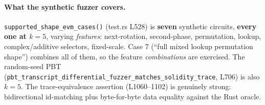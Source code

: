 \paragraph{What the synthetic fuzzer covers.}
\texttt{supported\_\allowbreak{}shape\_\allowbreak{}evm\_\allowbreak{}cases()} (test.rs L528) is
\textbf{seven} synthetic circuits, \textbf{every one at $k=5$},
varying \emph{features}: next-rotation, second-phase,
permutation, lookup, complex/additive selectors, fixed-scale.
Case 7 (``full mixed lookup permutation shape'') combines all of
them, so the feature \emph{combinations} are exercised. The
random-seed PBT
(\texttt{pbt\_\allowbreak{}transcript\_\allowbreak{}differential\_\allowbreak{}fuzzer\_\allowbreak{}matches\_\allowbreak{}solidity\_\allowbreak{}trace},
L706) is also $k=5$. The trace-equivalence assertion
(L1060--1102) is genuinely strong: bidirectional id-matching
plus byte-for-byte data equality against the Rust oracle.


